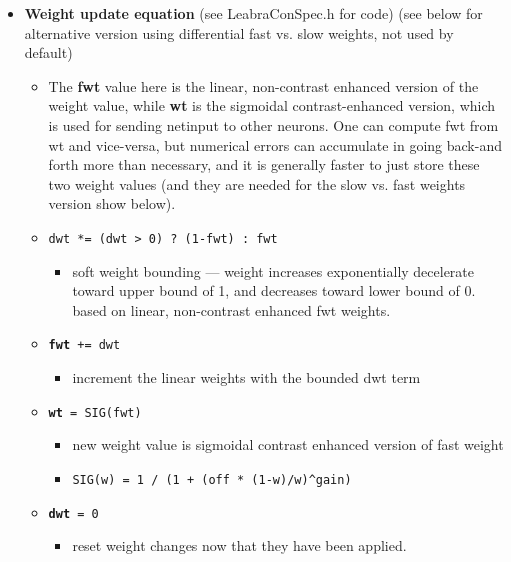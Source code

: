 \begin{itemize}
\tightlist
\item
  \textbf{Weight update equation} (see LeabraConSpec.h for code) (see
  below for alternative version using differential fast vs. slow
  weights, not used by default)

  \begin{itemize}
  \tightlist
  \item
    The \textbf{fwt} value here is the linear, non-contrast enhanced
    version of the weight value, while \textbf{wt} is the sigmoidal
    contrast-enhanced version, which is used for sending netinput to
    other neurons. One can compute fwt from wt and vice-versa, but
    numerical errors can accumulate in going back-and forth more than
    necessary, and it is generally faster to just store these two weight
    values (and they are needed for the slow vs. fast weights version
    show below).
  \item
    \texttt{dwt\ *=\ (dwt\ \textgreater{}\ 0)\ ?\ (1-fwt)\ :\ fwt}

    \begin{itemize}
    \tightlist
    \item
      soft weight bounding --- weight increases exponentially
      decelerate toward upper bound of 1, and decreases toward lower
      bound of 0. based on linear, non-contrast enhanced fwt weights.
    \end{itemize}
  \item
    \textbf{\texttt{fwt}}\texttt{\ +=\ dwt}

    \begin{itemize}
    \tightlist
    \item
      increment the linear weights with the bounded dwt term
    \end{itemize}
  \item
    \textbf{\texttt{wt}}\texttt{\ =\ SIG(fwt)}

    \begin{itemize}
    \tightlist
    \item
      new weight value is sigmoidal contrast enhanced version of fast
      weight
    \item
      \texttt{SIG(w)\ =\ 1\ /\ (1\ +\ (off\ *\ (1-w)/w)\^{}gain)}
    \end{itemize}
  \item
    \textbf{\texttt{dwt}}\texttt{\ =\ 0}

    \begin{itemize}
    \tightlist
    \item
      reset weight changes now that they have been applied.
    \end{itemize}
  \end{itemize}
\end{itemize}

